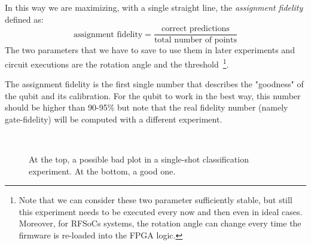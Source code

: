 In this way we are maximizing, with a single straight line, the \textit{assignment fidelity} defined as:
\begin{equation}
    \text{assignment fidelity} = \frac{\text{correct predictions}}{\text{total number of points}}
\end{equation}
The two parameters that we have to save to use them in later experiments and circuit executions are the rotation angle and the threshold~\footnote{Note that we can consider these two parameter sufficiently stable, but still this experiment needs to be executed every now and then even in ideal cases. Moreover, for RFSoCs systems, the rotation angle can change every time the firmware is re-loaded into the FPGA logic.}.

The assignment fidelity is the first single number that describes the "goodness" of the qubit and its calibration. 
For the qubit to work in the best way, this number should be higher than 90-95\% but note that the real fidelity number (namely gate-fidelity) will be computed with a different experiment.

\begin{figure}[ht]
    \centering
    \\
    \caption{At the top, a possible bad plot in a single-shot classification experiment. At the bottom, a good one.}%
    \label{fig:single_shot_class_80_60}
\end{figure}


